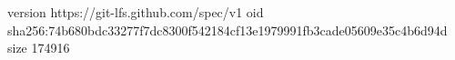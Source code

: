 version https://git-lfs.github.com/spec/v1
oid sha256:74b680bdc33277f7dc8300f542184cf13e1979991fb3cade05609e35c4b6d94d
size 174916
